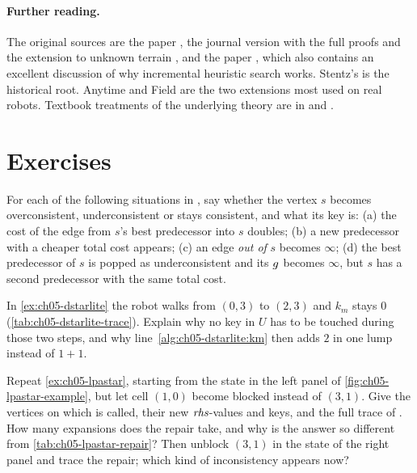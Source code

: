 \paragraph{Further reading.}
The original sources are the \dstarlite paper \cite{koenig2002dstarlite}, the journal
version with the full proofs and the extension to unknown terrain
\cite{koenig2005fast}, and the \lpastar paper \cite{koenig2004lpa}, which also contains
an excellent discussion of why incremental heuristic search works. Stentz's \dstar
\cite{stentz1994optimal} is the historical root. Anytime \dstar
\cite{likhachev2005anytime} and Field \dstar \cite{ferguson2006field} are the two
extensions most used on real robots. Textbook treatments of the underlying \astar
theory are in \textcite{russell2020aima} and \textcite{lavalle2006planning}.

\section{Exercises}
\label{sec:ch05-exercises}

\begin{exercise}[\difficulty{1}]
\label{exr:ch05-states}
For each of the following situations in \lpastar, say whether the vertex $s$ becomes
overconsistent, underconsistent or stays consistent, and what its key is: (a) the cost
of the edge from $s$'s best predecessor into $s$ doubles; (b) a new predecessor with a
cheaper total cost appears; (c) an edge \emph{out of} $s$ becomes $\infty$; (d) the best
predecessor of $s$ is popped as underconsistent and its $g$ becomes $\infty$, but
$s$ has a second predecessor with the same total cost.
\end{exercise}

\begin{exercise}[\difficulty{1}]
\label{exr:ch05-nomove}
In \cref{ex:ch05-dstarlite} the robot walks from $(0,3)$ to $(2,3)$ and $k_m$ stays $0$
(\cref{tab:ch05-dstarlite-trace}). Explain why no key in $U$ has to be touched during
those two steps, and why line~\ref{alg:ch05-dstarlite:km} then adds $2$ in one lump
instead of $1+1$.
\end{exercise}

\begin{exercise}
\label{exr:ch05-handtrace}
Repeat \cref{ex:ch05-lpastar}, starting from the state in the left panel of
\cref{fig:ch05-lpastar-example}, but let cell $(1,0)$ become blocked instead of
$(3,1)$. Give the vertices on which \LpaUpdateVertex is called, their new $\mathit{rhs}$-values
and keys, and the full trace of \LpaComputeShortestPath. How many expansions does the
repair take, and why is the answer so different from \cref{tab:ch05-lpastar-repair}?
Then unblock $(3,1)$ in the state of the right panel and trace the repair; which kind of
inconsistency appears now?
\end{exercise}

